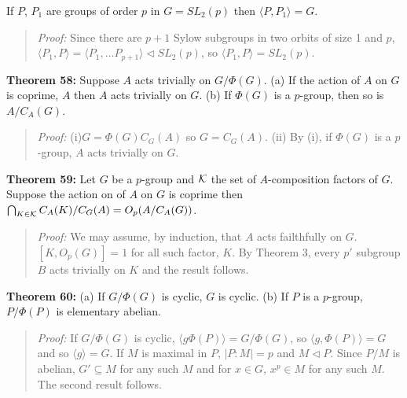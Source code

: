 If $P$, $P_1$ are groups of order $p$ in $G = SL_2(p)$ then $\langle P, P_1 \rangle = G$.
\begin{quote}
\emph{Proof:}
Since there are $p + 1$ Sylow subgroups in two orbits of size 1 and $p$, $\langle P_1, P \rangle =
\langle P_1, \ldots P_{p+1} \rangle \lhd SL_2(p)$, so $\langle P_1, P \rangle = SL_2(p)$.
\end{quote}
{\bf Theorem 58:}
Suppose $A$ acts trivially on $G/\Phi(G)$.  (a) If the action of $A$ on $G$ is coprime, $A$
then $A$ acts trivially on $G$. (b) If $\Phi(G)$ is a $p$-group, then so is $A/C_A(G)$.
\begin{quote}
\emph{Proof:} (i)$G= \Phi(G)C_G(A)$ so  $G= C_G(A)$.
(ii) By (i), if $\Phi(G)$ is a $p$-group, $A$ acts trivially on $G$.
\end{quote}
{\bf Theorem 59:}
Let $G$ be a $p$-group and ${\cal K}$ the set of $A$-composition factors of $G$.  Suppose the action on
of $A$ on $G$ is coprime then $\bigcap_{K \in {\cal K}} C_A(K)/C_G(A) = O_p(A/C_A(G))$.
\begin{quote}
\emph{Proof:}  We may assume, by induction, that $A$ acts failthfully on $G$.
$[K,O_p(G)] = 1$ for all such factor, $K$.
By Theorem 3, every $p'$ subgroup $B$ acts trivially on $K$ and the result follows.
\end{quote}
{\bf Theorem 60:}  (a) If $G/\Phi(G)$ is cyclic, $G$ is cyclic.
(b) If $P$ is a $p$-group, $P/\Phi(P)$ is elementary abelian.
\begin{quote}
\emph{Proof:}  If $G/\Phi(G)$ is cyclic, $\langle g\Phi(P) \rangle = G/\Phi(G)$, so $\langle g, \Phi(P) \rangle = G$ and so
$\langle g \rangle = G$.  If $M$ is maximal in $P$, $|P:M| = p$ and $M \lhd P$.  Since $P/M$ is abelian,
$G' \subseteq M$ for any such $M$ and for $x \in G$, $x^p \in M$ for any such $M$.  The second result follows.
\end{quote}
